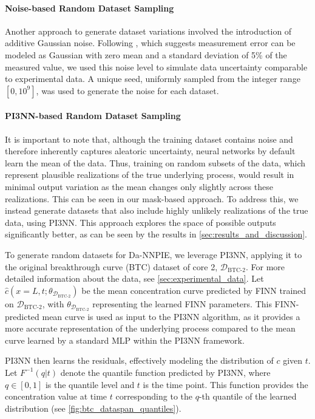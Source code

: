 \paragraph{Noise-based Random Dataset Sampling}
\label{sec:da-nnpie_gaussian_noise}
Another approach to generate dataset variations involved the introduction of additive Gaussian noise. Following \textcite{nowak2016entropy}, which suggests measurement error can be modeled as Gaussian with zero mean and a standard deviation of 5\% of the measured value, we used this noise level to simulate data uncertainty comparable to experimental data. A unique seed, uniformly sampled from the integer range $[0, 10^9]$, was used to generate the noise for each dataset.


\paragraph{PI3NN-based Random Dataset Sampling}
\label{sec:random_dataset_sampling}
It is important to note that, although the training dataset contains noise and therefore inherently captures aleatoric uncertainty, neural networks by default learn the mean of the data. Thus, training on random subsets of the data, which represent plausible realizations of the true underlying process, would result in minimal output variation as the mean changes only slightly across these realizations. This can be seen in our mask-based approach. To address this, we instead generate datasets that also include highly unlikely realizations of the true data, using PI3NN. This approach explores the space of possible outputs significantly better, as can be seen by the results in \cref{sec:results_and_discussion}.

To generate random datasets for Da-NNPIE, we leverage PI3NN, applying it to the original breakthrough curve (BTC) dataset of core 2, $\mathcal{D}_{\text{BTC-2}}$. For more detailed information about the data, see \cref{sec:experimental_data}.
Let $\hat{c}(x=L,t;\theta_{\mathcal{D}_{\text{BTC-2}}})$ be the mean concentration curve predicted by FINN trained on $\mathcal{D}_{\text{BTC-2}}$, with $\theta_{\mathcal{D}_{\text{BTC-2}}}$ representing the learned FINN parameters. This FINN-predicted mean curve is used as input to the PI3NN algorithm, as it provides a more accurate representation of the underlying process compared to the mean curve learned by a standard MLP within the PI3NN framework.

PI3NN then learns the residuals, effectively modeling the distribution of $c$ given $t$. Let $F^{-1}(q | t)$ denote the quantile function predicted by PI3NN, where $q \in [0, 1]$ is the quantile level and $t$ is the time point. This function provides the concentration value at time $t$ corresponding to the $q$-th quantile of the learned distribution (see \cref{fig:btc_dataspan_quantiles}).

